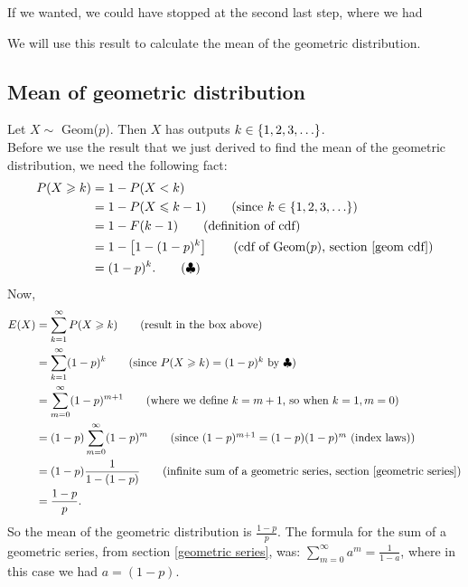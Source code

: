 \noindent If we wanted, we could have stopped at the second last step, where we had

  	\bigskip
	
	\hfil{}
	\bigskip
	\bigskip



\noindent We will use this result to calculate the mean of the geometric distribution.


\subsection{Mean of geometric distribution} \label{meanGeom}
Let $X \sim$ Geom($p$). Then $X$ has outputs $k \in \left\{1,2,3,\ldots\right\}$. \\

\noindent Before we use the result that we just derived to find the mean of the geometric distribution, we need the following fact: \\
\begin{align*}
P(X \geq k) & = 1 - P(X < k) \\
	          & = 1 - P(X \leq k - 1) \tag{since $k \in \set{1,2,3,\ldots}$} \\
	          & = 1 - F(k-1) \tag{definition of cdf} \\
	          & = 1 - \squac{1-(1-p)^k} \tag{cdf of Geom($p$), section \ref{geom cdf}} \\
	          & = (1 - p)^k. \tag{$\clubsuit$}
\end{align*}
Now,
\begin{align*}
E(X) 	& = \sum_{k=1}^\infty P(X \geq k) \tag{result in the box above} \\
	& = \sum_{k=1}^\infty (1-p)^k \tag{since $P(X \geq k) = (1-p)^k$ by $\clubsuit$} \\
	& = \sum_{m=0}^\infty (1-p)^{m+1} \tag{where we define $k = m+1$, so when $k = 1, m = 0$} \\
	& = (1-p)\sum_{m=0}^\infty(1-p)^m \tag{since $(1-p)^{m+1} = (1-p)(1-p)^m$ (index laws)} \\
	& = (1-p)\frac{1}{1-(1-p)} \tag{infinite sum of a geometric series, section \ref{geometric series}} \\
	& = \frac{1-p}{p}.
\end{align*}
So the mean of the geometric distribution is $\frac{1-p}{p}$. The formula for the sum of a geometric series, from section \ref{geometric series}, was: $\displaystyle{\sum_{m=0}^\infty a^m = \frac{1}{1-a}}$, where in this case we had $a = (1-p)$. 